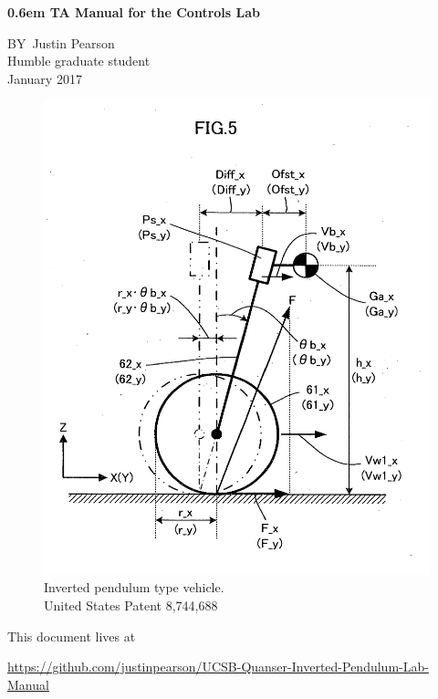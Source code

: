 \documentclass{book}
\begin{document}
\clearpage
\newcommand\nbvspace[1][3]{\vspace*{\stretch{#1}}}
\newcommand\nbstretchyspace{\spaceskip0.5em plus 0.25em minus 0.25em}
\newcommand{\nbtitlestretch}{\spaceskip0.6em}
\pagestyle{empty}
\begin{center}
\bfseries
\nbvspace[1]
\Huge
{\nbtitlestretch\huge
TA Manual for the Controls Lab}

\nbvspace[1]
\normalsize

\nbvspace[1]
\small BY\    \Large Justin Pearson\\[0.5em]
\footnotesize Humble graduate student \\ January 2017

\nbvspace[2]



\begin{figure}[H]
\centering
\includegraphics[width=.5\textwidth]{./Images/imgf0005.png}
  \caption{Inverted pendulum type vehicle. \\ United States Patent 8,744,688}
\end{figure}
\nbvspace[3]
\normalsize

This document lives at 

\url{https://github.com/justinpearson/UCSB-Quanser-Inverted-Pendulum-Lab-Manual}

\nbvspace[1]
\end{center}
\end{document}
